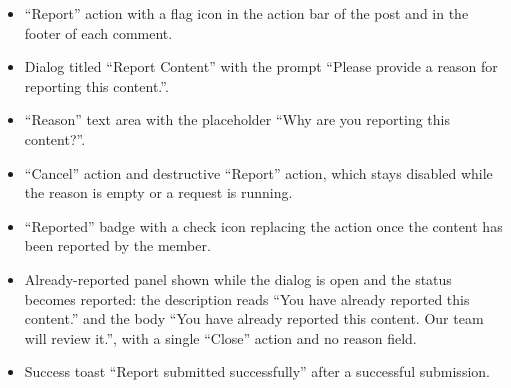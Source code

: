\begin{itemize}[leftmargin=1.6em,topsep=3pt,itemsep=2pt,parsep=0pt,label=$\bullet$]
      \item ``Report'' action with a flag icon in the action bar of the post and in the footer of
            each comment.
      \item Dialog titled ``Report Content'' with the prompt ``Please provide a reason for
            reporting this content.''.
      \item ``Reason'' text area with the placeholder ``Why are you reporting this content?''.
      \item ``Cancel'' action and destructive ``Report'' action, which stays disabled while the
            reason is empty or a request is running.
      \item ``Reported'' badge with a check icon replacing the action once the content has been
            reported by the member.
      \item Already-reported panel shown while the dialog is open and the status becomes
            reported: the description reads ``You have already reported this content.'' and
            the body ``You have already reported this content. Our team will review it.'',
            with a single ``Close'' action and no reason field.
      \item Success toast ``Report submitted successfully'' after a successful submission.
\end{itemize}

